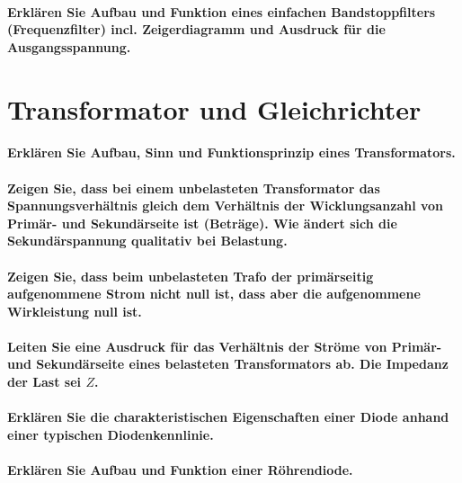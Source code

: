 \documentclass[a4paper, 11pt, parskip=half]{scrartcl}
\begin{document}
\paragraph{Erklären Sie Aufbau und Funktion eines einfachen Bandstoppfilters (Frequenzfilter) incl.
Zeigerdiagramm und Ausdruck für die Ausgangsspannung.}

\newpage

\section{Transformator und Gleichrichter}

\paragraph{Erklären Sie Aufbau, Sinn und Funktionsprinzip eines Transformators.}

\paragraph{Zeigen Sie, dass bei einem unbelasteten Transformator das Spannungsverhältnis gleich dem
Verhältnis der Wicklungsanzahl von Primär- und Sekundärseite ist (Beträge). Wie ändert sich die
Sekundärspannung qualitativ bei Belastung.}

\paragraph{Zeigen Sie, dass beim unbelasteten Trafo der primärseitig aufgenommene Strom nicht null
ist, dass aber die aufgenommene Wirkleistung null ist.}

\paragraph{Leiten Sie eine Ausdruck für das Verhältnis der Ströme von Primär- und Sekundärseite
eines belasteten Transformators ab. Die Impedanz der Last sei $Z$.}

\paragraph{Erklären Sie die charakteristischen Eigenschaften einer Diode anhand einer typischen
Diodenkennlinie.}

\paragraph{Erklären Sie Aufbau und Funktion einer Röhrendiode.}
\end{document}
